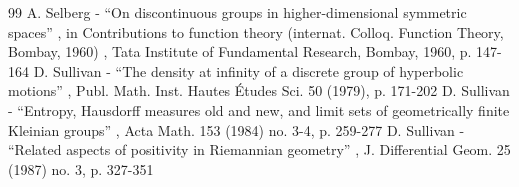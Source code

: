 \begin{thebibliography}{99}
 A. Selberg - “On discontinuous groups in higher-dimensional symmetric spaces” , in Contributions to function theory (internat. Colloq. Function Theory, Bombay, 1960) , Tata Institute of Fundamental Research, Bombay, 1960, p. 147-164
 D. Sullivan - “The density at infinity of a discrete group of hyperbolic motions” , Publ. Math. Inst. Hautes Études Sci. 50 (1979), p. 171-202
 D. Sullivan - “Entropy, Hausdorff measures old and new, and limit sets of geometrically finite Kleinian groups” , Acta Math. 153 (1984) no. 3-4, p. 259-277
 D. Sullivan - “Related aspects of positivity in Riemannian geometry” , J. Differential Geom. 25 (1987) no. 3, p. 327-351
\end{thebibliography}
